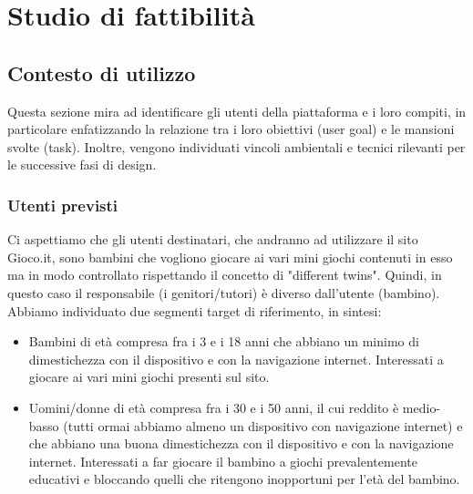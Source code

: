 \documentclass[../Report.tex]{subfiles}
\begin{document}
    \chapter{Studio di fattibilità}
    \section{Contesto di utilizzo}
    Questa sezione mira ad identificare gli utenti della piattaforma e i loro compiti, in particolare enfatizzando la relazione tra i loro obiettivi (user goal) e le mansioni svolte (task). Inoltre, vengono individuati vincoli ambientali e tecnici rilevanti per le successive fasi di design.
        
        \subsection{Utenti previsti}
        Ci aspettiamo che gli utenti destinatari, che andranno ad utilizzare il sito Gioco.it, sono bambini che vogliono giocare ai vari mini giochi contenuti in esso ma in modo controllato rispettando il concetto di "different twins". Quindi, in questo caso il responsabile (i genitori/tutori) è diverso dall'utente (bambino).\\
        Abbiamo individuato due segmenti target di riferimento, in sintesi:
        \begin{itemize}
            \item Bambini di età compresa fra i 3 e i 18 anni che abbiano un minimo di dimestichezza con il dispositivo e con la navigazione internet. Interessati a giocare ai vari mini giochi presenti sul sito.
            \item Uomini/donne di età compresa fra i 30 e i 50 anni, il cui reddito è medio-basso (tutti ormai abbiamo almeno un dispositivo con navigazione internet) e che abbiano una buona dimestichezza con il dispositivo e con la navigazione internet. Interessati a far giocare il bambino a giochi prevalentemente educativi e bloccando quelli che ritengono inopportuni per l'età del bambino.
        \end{itemize} 
\end{document}
